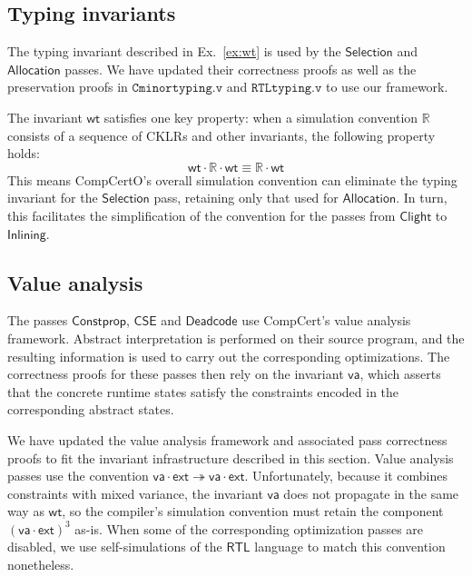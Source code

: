\documentclass[draft,11pt]{report}
\newcommand{\kw}[1]{\ensuremath{ \mathsf{#1} }}
\begin{document}
\subsection{Typing invariants} \label{sec:wt} %

The typing invariant described in Ex.~\ref{ex:wt}
is used by the $\kw{Selection}$ and $\kw{Allocation}$ passes.
We have updated their correctness proofs
as well as the preservation proofs in
$\texttt{Cminortyping.v}$ and $\texttt{RTLtyping.v}$
to use our framework.

The invariant $\kw{wt}$ satisfies one key property:
when a simulation convention $\mathbb{R}$
consists of a sequence of CKLRs and other invariants,
the following property holds:
\[
  \kw{wt} \cdot \mathbb{R} \cdot \kw{wt} \equiv
  \mathbb{R} \cdot \kw{wt}
\]
This means CompCertO's overall simulation convention
can eliminate the typing invariant for the $\kw{Selection}$ pass,
retaining only that used for $\kw{Allocation}$.
In turn, this facilitates the simplification of the convention for
the passes from \kw{Clight} to \kw{Inlining}.


\subsection{Value analysis} \label{sec:va} %

The passes
$\kw{Constprop}$, $\kw{CSE}$ and $\kw{Deadcode}$
use CompCert's value analysis framework.
Abstract interpretation is performed %
on their source program,
and the resulting information is used to carry out
the corresponding optimizations.
The correctness proofs for these passes then rely
on the invariant $\kw{va}$,
which asserts that the concrete runtime states
satisfy the constraints encoded in the corresponding
abstract states.

We have updated the value analysis framework
and associated pass correctness proofs
to fit the invariant infrastructure described in this section.
Value analysis passes use the convention
$\kw{va} \cdot \kw{ext} \twoheadrightarrow \kw{va} \cdot \kw{ext}$.
Unfortunately,
because it combines constraints with mixed variance,
the invariant $\kw{va}$ does not propagate in the same way as $\kw{wt}$,
so the compiler's simulation convention must retain
the component $(\kw{va} \cdot \kw{ext})^3$ as-is.
When some of the corresponding optimization passes are disabled,
we use self-simulations of the $\kw{RTL}$ language
to match this convention nonetheless.
\end{document}

